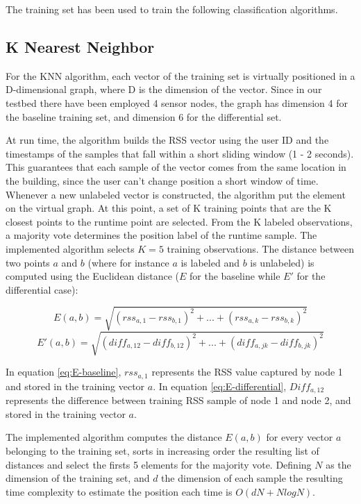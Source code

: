 The training set has been used to train the following classification algorithms.

\subsection{K Nearest Neighbor}
\label{subsec:knn}
For the KNN algorithm, each vector of the training set is virtually positioned in a D-dimensional graph, where D is the dimension of the vector. Since in our testbed there have been employed 4 sensor nodes, the graph has dimension 4 for the baseline training set, and dimension 6 for the differential set.

At run time, the algorithm builds the RSS vector using the user ID and the timestamps of the samples that fall within a short sliding window (1 - 2 seconds). This guarantees that each sample of the vector comes from the same location in the building, since the user can't change position a short window of time.
Whenever a new unlabeled vector is constructed, the algorithm put the element on the virtual graph. At this point, a set of K training points that are the K closest points to the runtime point are selected. From the K labeled observations, a majority vote determines the position label of the runtime sample. The implemented algorithm selects $K=5$ training observations.
The distance between two points $a$ and $b$ (where for instance $a$ is labeled and $b$ is unlabeled) is computed using the Euclidean distance ($E$ for the baseline while $E'$ for the differential case):

\begin{equation}\label{eq:E-baseline}
E(a,b)=\sqrt{(rss_{a,1} - rss_{b,1})^2 + ... + (rss_{a,k} - rss_{b,k})^2}
\end{equation}
\begin{equation}\label{eq:E-differential}
E'(a,b)=\sqrt{(diff_{a,12} - diff_{b,12})^2 + ... + (diff_{a,jk} - diff_{b,jk})^2}
\end{equation}

In equation \ref{eq:E-baseline}, $rss_{a,1}$ represents the RSS value captured by node 1 and stored in the training vector $a$. In equation \ref{eq:E-differential}, $Diff_{a,12}$ represents the difference between training RSS sample of node 1 and node 2, and stored in the training vector $a$.

\medskip
The implemented algorithm computes the distance $E(a,b)$ for every vector $a$ belonging to the training set, sorts in increasing order the resulting list of distances and select the firsts 5 elements for the majority vote. Defining $N$ as the dimension of the training set, and $d$ the dimension of each sample the resulting time complexity to estimate the position each time is $O(dN + NlogN)$.

